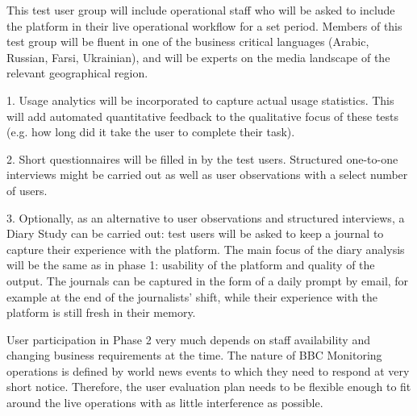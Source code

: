 This test user group will include operational staff who will be asked to include the \SUMMA platform in their live operational workflow for a set period. Members of this test group will be fluent in one of the business critical languages (Arabic, Russian, Farsi, Ukrainian), and will be experts on the  media landscape of the relevant geographical region.


\smallskip

1. Usage analytics will be incorporated to capture actual usage statistics. This will add automated quantitative feedback to the qualitative focus of these tests (e.g. how long did it take the user to complete their task).

2. Short questionnaires will be filled in by the test users. Structured one-to-one interviews might be carried out as well as user observations with a select number of users. 

3. Optionally, as an alternative to user observations and structured interviews, a Diary Study can be carried out: test users will be asked to keep a journal to capture their experience with the platform. The main focus of the diary analysis will be the same as in phase 1: usability of the platform and quality of the output. The journals can be captured in the form of a daily prompt by email, for example at the end of the journalists' shift, while their experience with the platform is still fresh in their memory.
\medskip

User participation in Phase 2 very much depends on staff availability and changing business requirements at the time. The nature of BBC Monitoring operations is defined by world news events to which they need to respond at very short notice. Therefore, the user evaluation plan needs to be flexible enough to fit around the live operations with as little interference as possible.
\medskip


